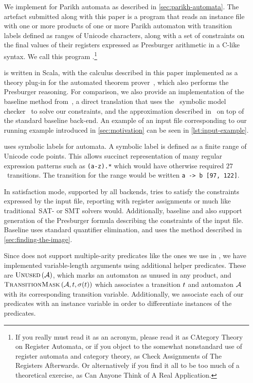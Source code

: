 \documentclass[acmsmall,review,anonymous,screen]{acmart}\settopmatter{printfolios=true,printccs=false,printacmref=true}
\theoremstyle{definition}
\begin{document}
We implement \Calculus{} for Parikh automata as described in
\cref{sec:parikh-automata}. The artefact submitted along with this paper is a
program that reads an instance file with one or more products of one or more
Parikh automaton with transition labels defined as ranges of Unicode characters,
along with a set of constraints on the final values of their registers expressed
as Presburger arithmetic in a C-like syntax. We call this program
\Catra.\footnote{If you really must read it as an acronym, please read it as
CAtegory Theory on Register Automata, or if you object to the somewhat
nonstandard use of register automata and category theory, as Check Assignments
of The Registers Afterwards. Or alternatively if you find it all to be too much
of a theoretical exercise, as Can Anyone Think of A Real Application.}

\Catra{} is written in Scala, with the calculus described in this paper
implemented as a theory plug-in for the \Princess{} automated theorem
prover~\cite{princess}, which also performs the Presburger reasoning. For
comparison, we also provide an implementation of the baseline method
from~\cite{generate-parikh-image}, a direct translation that uses the~\Nuxmv{}
symbolic model checker~\cite{nuxmv} to solve our constraints, and the
approximation described in~\cite{approximate-parikh} on top of the standard
baseline back-end. An example of an input file corresponding to our running
example introduced in \cref{sec:motivation} can be seen in
\cref{lst:input-example}.

\Catra{} uses symbolic labels for automata. A symbolic label is defined as a
finite range of Unicode code points. This allows succinct representation of many
regular expression patterns such as \lstinline{(a-z).*} which would have
otherwise required $27$~transitions. The transition for the range would be
written \lstinline{a -> b [97, 122]}.

In satisfaction mode, supported by all backends, \Catra{} tries to satisfy the
constraints expressed by the input file, reporting \Sat{} with register
assignments or \Unsat{} much like traditional~SAT- or SMT solvers would.
Additionally, baseline and \Calculus{} also support generation of the Presburger
formula describing the constraints of the input file. Baseline uses standard
quantifier elimination, and \Calculus{} uses the method described in
\cref{sec:finding-the-image}.

Since \Princess{} does not support multiple-arity predicates like the ones we
use in \Calculus{}, we have implemented variable-length arguments using
additional helper predicates. These are $\operatorname{\textsc{Unused}}{}(\mathcal{A})$, which marks an
automaton as unused in any product, and $\operatorname{\textsc{TransitionMask}}{}(\mathcal{A},
t, \operatorname{\sigma}(t))$ which associates a transition $t$
and automaton $\mathcal{A}$ with its corresponding transition variable.
Additionally, we associate each of our predicates with an instance variable in
order to differentiate instances of the predicates.
\end{document}
